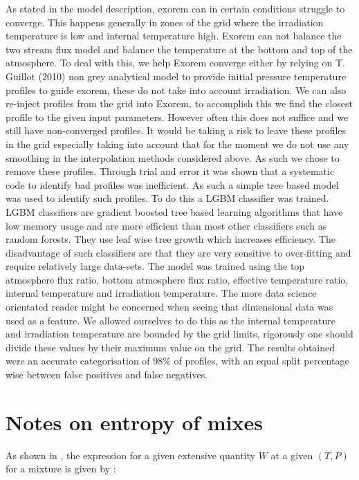 As stated in the model description, exorem can in certain conditions struggle to converge. This happens generally in zones of the grid where the irradiation temperature is low and internal temperature high. Exorem can not balance the two stream flux model and balance the temperature at the bottom and top of the atmosphere. To deal with this, we help Exorem converge either by relying on T. Guillot (2010) \parencite{guillot_radiative_2010} non grey analytical model to provide initial pressure temperature profiles to guide exorem, these do not take into account irradiation. We can also re-inject profiles from the grid into Exorem, to accomplish this we find the closest profile to the given input parameters. However often this does not suffice and we still have non-converged profiles. It would be taking a risk to leave these profiles in the grid especially taking into account that for the moment we do not use any smoothing in the interpolation methods considered above. As such we chose to remove these profiles. Through trial and error it was shown that a systematic code to identify bad profiles was inefficient. As such a simple tree based model was used to identify such profiles. To do this a LGBM classifier was trained. LGBM classifiers are gradient boosted tree based learning algorithms that have low memory usage and are more efficient than most other classifiers such as random forests. They use leaf wise tree growth which increases efficiency. The disadvantage of such classifiers are that they are very sensitive to over-fitting and require relatively large data-sets. The model was trained using the top atmosphere flux ratio, bottom atmosphere flux ratio, effective temperature ratio, internal temperature and irradiation temperature. The more data science orientated reader might be concerned when seeing that dimensional data was used as a feature. We allowed ourselves to do this as the internal temperature and irradiation temperature are bounded by the grid limits, rigorously one should divide these values by their maximum value on the grid. The results obtained were an accurate categorisation of 98\% of profiles, with an equal split percentage wise between false positives and false negatives. 

\section{Notes on entropy of mixes}

As shown in \parencite{chabrier_new_2019}, the expression for a given extensive quantity $W$ at a given $(T,P)$ for a mixture is given by :

